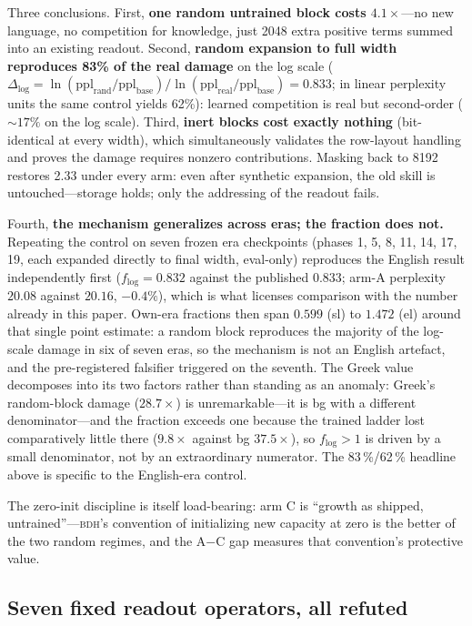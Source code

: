 \documentclass[11pt]{article}
\theoremstyle{definition}\newtheorem{definition}{Definition}
\theoremstyle{remark}\newtheorem{remark}{Remark}
\newcommand{\BDH}{\textsc{bdh}}
\begin{document}
Three conclusions. First, \textbf{one random untrained block costs $4.1\times$}---no new
language, no competition for knowledge, just 2048 extra positive terms summed into an
existing readout. Second, \textbf{random expansion to full width reproduces 83\% of the
real damage} on the log scale ($\Delta_{\log} = \ln(\mathrm{ppl}_{\mathrm{rand}}/\mathrm{ppl}_{\mathrm{base}}) / \ln(\mathrm{ppl}_{\mathrm{real}}/\mathrm{ppl}_{\mathrm{base}}) = 0.833$; in linear perplexity units the same control yields 62\%): learned competition is real but second-order ($\sim\!17\%$ on the log scale).
Third, \textbf{inert blocks cost exactly nothing} (bit-identical at every width), which
simultaneously validates the row-layout handling and proves the damage requires nonzero
contributions. Masking back to 8192 restores 2.33 under every arm: even after synthetic
expansion, the old skill is untouched---storage holds; only the addressing of the readout
fails.

Fourth, \textbf{the mechanism generalizes across eras; the fraction does not.} Repeating
the control on seven frozen era checkpoints (phases 1, 5, 8, 11, 14, 17, 19, each expanded
directly to final width, eval-only) reproduces the English result independently first
($f_{\log}=0.832$ against the published $0.833$; arm-A perplexity $20.08$ against
$20.16$, $-0.4\%$), which is what licenses comparison with the number already in this
paper. Own-era fractions then span $0.599$ (sl) to $1.472$ (el) around that single point
estimate: a random block reproduces the majority of the log-scale damage in six of seven
eras, so the mechanism is not an English artefact, and the pre-registered falsifier
triggered on the seventh. The Greek value decomposes into its two factors rather than
standing as an anomaly: Greek's random-block damage ($28.7\times$) is unremarkable---it is
bg with a different denominator---and the fraction exceeds one because the trained ladder
lost comparatively little there ($9.8\times$ against bg $37.5\times$), so $f_{\log}>1$ is
driven by a small denominator, not by an extraordinary numerator. The 83\,\%/62\,\%
headline above is specific to the English-era control.

The zero-init discipline is itself load-bearing: arm C is ``growth as shipped,
untrained''---\BDH{}'s convention of initializing new capacity at zero is the better of
the two random regimes, and the A$-$C gap measures that convention's protective value.

\subsection{Seven fixed readout operators, all refuted}
\end{document}
